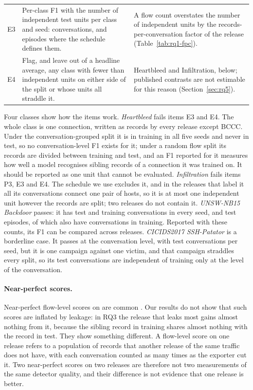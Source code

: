 \begin{table}[t]
\begin{tabularx}{\textwidth}{@{}l>{\raggedright\arraybackslash}p{5.6cm}L@{}}
E3 & Per-class F1 with the number of independent test units per class and seed: conversations, and episodes where the schedule defines them. & A flow count overstates the number of independent units by the records-per-conversation factor of the release (Table~\ref{tab:rq1-fpc}). \\
E4 & Flag, and leave out of a headline average, any class with fewer than \SetMinTest{} independent units on either side of the split or whose units all straddle it. & Heartbleed and Infiltration, below; \RQfiveNotEstimable{} published contrasts are not estimable for this reason (Section~\ref{sec:rq5}). \\
\bottomrule
\end{tabularx}
\end{table}

Four classes show how the items work. \emph{Heartbleed} fails items E3 and E4. The whole class is one connection, written as \RQoneHeartbleedRecords{} records by every release except BCCC. Under the conversation-grouped split it is in training in all five seeds and never in test, so no conversation-level F1 exists for it; under a random flow split its records are divided between training and test, and an F1 reported for it measures how well a model recognises sibling records of a connection it was trained on. It should be reported as one unit that cannot be evaluated. \emph{Infiltration} fails items P3, E3 and E4. The schedule we use excludes it, and in the releases that label it all its conversations connect one pair of hosts, so it is at most one independent unit however the records are split; two releases do not contain it. \emph{UNSW-NB15 Backdoor} passes: it has \RQfourBackdoorTest{} test and \RQfourBackdoorTrain{} training conversations in every seed, and \RQfourBackdoorEpTest{} test episodes, of which \RQfourBackdoorEpStrad{} also have conversations in training. Reported with these counts, its F1 can be compared across releases. \emph{CICIDS2017 SSH-Patator} is a borderline case. It passes at the conversation level, with \RQfourSshTestConv{} test conversations per seed, but it is one campaign against one victim, and that campaign straddles every split, so its test conversations are independent of training only at the level of the conversation.

\paragraph{Near-perfect scores.} Near-perfect flow-level scores on \cicids{} are common \cite{maseer2021}. Our results do not show that such scores are inflated by leakage: in RQ3 the release that leaks most gains almost nothing from it, because the sibling record in training shares almost nothing with the record in test. They show something different. A flow-level score on one release refers to a population of records that another release of the same traffic does not have, with each conversation counted as many times as the exporter cut it. Two near-perfect scores on two releases are therefore not two measurements of the same detector quality, and their difference is not evidence that one release is better.

